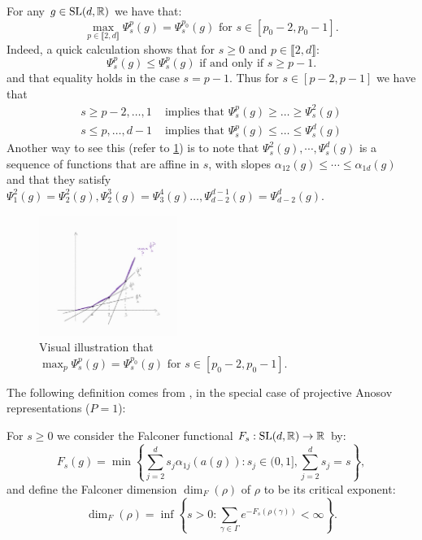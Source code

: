 \documentclass{report}
\begin{document}
\begin{remark}
For any $g \in \operatorname{{\mathrm{SL}}}(d, \mathbb R)$ we have that:
\[
    \max_{p \in \llbracket 2, d \rrbracket} \Psi_s^p(g) = \Psi_s^{p_0}(g) \text{ for } s \in [p_0 - 2, p_0 -1].
\]
Indeed, a quick calculation shows that for $s \geq 0$ and $p \in \llbracket 2, d \rrbracket$:
\[
    \Psi_s^p(g) \leq \Psi_s^p(g) \text{ if and only if } s \geq p-1.
\]
and that equality holds in the case $s = p - 1$.
Thus for $s \in [p - 2, p-1]$ we have that
\begin{align*}
    s \geq p-2, \ldots, 1 &\text{ implies that } \Psi_s^p(g) \geq \ldots \geq \Psi_s^{2}(g)\\
    s \leq p, \ldots, d-1 &\text{ implies that } \Psi_s^p(g) \leq \ldots \leq \Psi_s^d(g)
\end{align*}
Another way to see this (refer to \cref{fig:max}) is to note that $\Psi_s^2(g), \cdots, \Psi_s^d(g)$ is a sequence of functions that are affine in $s$, with slopes $\alpha_{12}(g) \leq \cdots \leq \alpha_{1d}(g)$ and that they satisfy $\Psi_1^2(g) = \Psi_2^2(g), \Psi_2^3(g) = \Psi_3^4(g) \ldots, \Psi_{d-2}^{d-1}(g) = \Psi_{d-2}^d(g)$.
\begin{figure}[h]
    \centering
    \includegraphics[width=0.4\textwidth]{max.jpg}
    \caption{Visual illustration that $\max_p\Psi_s^p(g) = \Psi_s^{p_0}(g) \text{ for } s \in [p_0 - 2, p_0 -1]$.}
    \label{fig:max}
\end{figure}    
\end{remark}


The following definition comes from \cite{ledrappier_dimension_2023}, in the special case of projective Anosov representations ($P = {1}$):
\begin{definition}
    For $s \geq 0$ we consider the Falconer functional $F_s : \operatorname{{\mathrm{SL}}}(d, \mathbb R) \to \mathbb R$ by:
    \[
        F_s(g) = \min 
        \left\{
            \sum_{j=2}^d s_j \alpha_{1j}(a(g)) : s_j \in (0,1], \sum_{j=2}^d s_j = s 
        \right\},
    \]
    and define the Falconer dimension $\dim_F(\rho)$ of $\rho$ to be its critical exponent:
    \[
        \dim_F(\rho) = \inf
        \left\{
            s > 0: \sum_{\gamma \in \Gamma} e^{-F_s(\rho(\gamma))} < \infty
        \right\}.
    \]
\end{definition}
\end{document}
